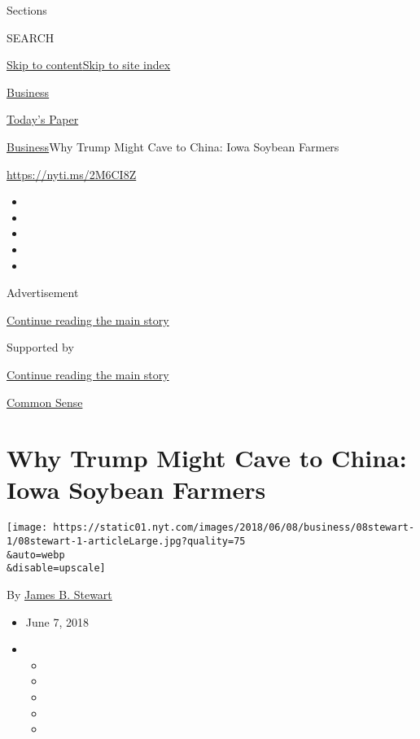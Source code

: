 Sections

SEARCH

\protect\hyperlink{site-content}{Skip to
content}\protect\hyperlink{site-index}{Skip to site index}

\href{https://www.nytimes.com/section/business}{Business}

\href{https://myaccount.nytimes.com/auth/login?response_type=cookie\&client_id=vi}{}

\href{https://www.nytimes.com/section/todayspaper}{Today's Paper}

\href{/section/business}{Business}\textbar{}Why Trump Might Cave to
China: Iowa Soybean Farmers

\url{https://nyti.ms/2M6CI8Z}

\begin{itemize}
\item
\item
\item
\item
\item
\end{itemize}

Advertisement

\protect\hyperlink{after-top}{Continue reading the main story}

Supported by

\protect\hyperlink{after-sponsor}{Continue reading the main story}

\href{/column/common-sense}{Common Sense}

\hypertarget{why-trump-might-cave-to-china-iowa-soybean-farmers}{%
\section{Why Trump Might Cave to China: Iowa Soybean
Farmers}\label{why-trump-might-cave-to-china-iowa-soybean-farmers}}

\texttt{[image: https://static01.nyt.com/images/2018/06/08/business/08stewart-1/08stewart-1-articleLarge.jpg?quality=75\\\&auto=webp\\\&disable=upscale]}

By \href{https://www.nytimes.com/by/james-b-stewart}{James B. Stewart}

\begin{itemize}
\item
  June 7, 2018
\item
  \begin{itemize}
  \item
  \item
  \item
  \item
  \item
  \end{itemize}
\end{itemize}

